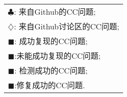 \begin{table}[htbp]
\begin{tabular}{|l|}
		\multicolumn{1}{l}{{\color{Status2}$\clubsuit$}: 来自Github的CC问题;} \\
		\multicolumn{1}{l}{{\color{Status4}$\diamondsuit$}: 来自Github讨论区的CC问题;}\\
		\multicolumn{1}{l}{{\color{Status9}$\blacksquare$}: 成功复现的CC问题;}\\
		\multicolumn{1}{l}{{\color{Status7}$\blacksquare$}:未能成功复现的CC问题;}\\
		\multicolumn{1}{l}{{\color{Status10}$\blacksquare$}:  \tool{}检测成功的CC问题;}\\
		\multicolumn{1}{l}{{\color{Status5}$\blacksquare$}:\tool{}修复成功的CC问题.}\\
	\end{tabular}
	\egroup
	\label{tab:issues}
\end{table}